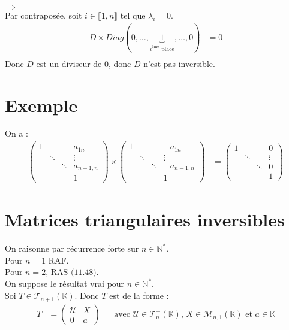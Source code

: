 \documentclass[../main.tex]{subfiles}
\begin{document}
$\boxed{\Rightarrow}$ \\
Par contraposée, soit $i \in \llbracket 1, n \rrbracket$ tel que $\lambda_i = 0$. \\
\begin{align*}
    D \times Diag(0, \ldots, \underbrace{1}_{i^\text{ème} \text{ place}}, \ldots, 0) &= 0 \\
\end{align*}
Donc $D$ est un diviseur de $0$, donc $D$ n'est pas inversible.

\section{Exemple}
On a : 
\begin{align*}
    \begin{pmatrix}
        1 & & & a_{1n} \\
        & \ddots & & \vdots \\
        & & \ddots & a_{n-1,n} \\
        & & & 1
    \end{pmatrix}
    \times
    \begin{pmatrix}
        1 & & & -a_{1n} \\
        & \ddots & & \vdots \\
        & & \ddots & -a_{n-1,n} \\
        & & & 1
    \end{pmatrix}
    &=
    \begin{pmatrix}
        1 & & & 0 \\
        & \ddots & & \vdots \\
        & & \ddots & 0 \\
        & & & 1
    \end{pmatrix}
\end{align*}

\section{Matrices triangulaires inversibles}
On raisonne par récurrence forte sur $n \in \mathbb{N}^*$. \\
Pour $n = 1$ RAF. \\
Pour $n = 2$, RAS $\text{(11.48)}$. \\
On suppose le résultat vrai pour $n \in \mathbb{N}^*$. \\
Soi $T \in \mathcal{T}_{n+1}^{+}(\mathbb{K})$. Donc $T$ est de la forme : \\
\begin{align*}
    T &= 
    \begin{pmatrix}
         \mathcal{U}& X \\
        0 & a
    \end{pmatrix}
    && \text{avec } \mathcal{U} \in \mathcal{T}_n^{+}(\mathbb{K}) \text{, } X \in \mathcal{M}_{n,1}(\mathbb{K}) \text{ et } a \in \mathbb{K}
\end{align*}
\end{document}

